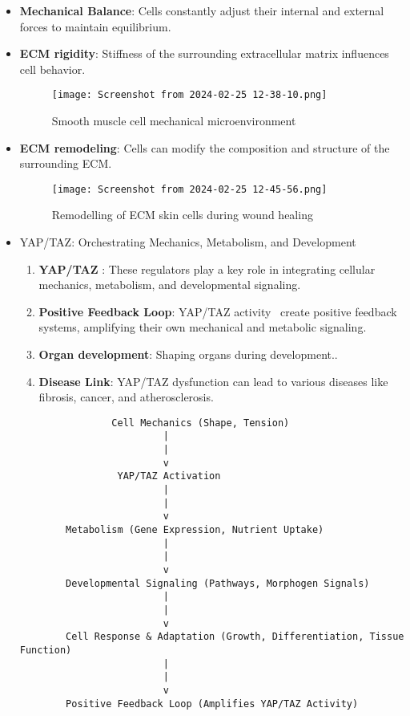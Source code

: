 \documentclass{article}
\begin{document}
\begin{itemize}
\item \textbf{Mechanical Balance}: Cells constantly adjust their internal and external forces to maintain equilibrium.
\item \textbf{ECM rigidity}: Stiffness of the surrounding extracellular matrix influences cell behavior.
\begin{figure}[h]
    \centering
    \texttt{[image: Screenshot from 2024-02-25 12-38-10.png]}
    \caption{Smooth muscle cell mechanical microenvironment}
    \label{fig:enter-label}
\end{figure}
\newpage
\item \textbf{ECM remodeling}: Cells can modify the composition and structure of the surrounding ECM.
\begin{figure}
    \centering
    \texttt{[image: Screenshot from 2024-02-25 12-45-56.png]}
    \caption{Remodelling of ECM skin cells during wound healing}
    \label{fig:enter-label}
\end{figure}
\item YAP/TAZ: Orchestrating Mechanics, Metabolism, and Development
\begin{enumerate}
\item \textbf{YAP/TAZ} : These regulators play a key role in integrating cellular mechanics, metabolism, and developmental signaling.
\item \textbf{Positive Feedback Loop}: YAP/TAZ activity \ create positive feedback systems, amplifying their own mechanical and metabolic signaling.
\item \textbf{Organ development}: Shaping organs during development..
\item \textbf{Disease Link}: YAP/TAZ dysfunction can lead to various diseases like fibrosis, cancer, and atherosclerosis.
\end{enumerate}    
\begin{verbatim}
                Cell Mechanics (Shape, Tension)
                         | 
                         |  
                         v    
                 YAP/TAZ Activation
                         | 
                         |  
                         v    
        Metabolism (Gene Expression, Nutrient Uptake)
                         | 
                         |  
                         v    
        Developmental Signaling (Pathways, Morphogen Signals)
                         | 
                         |  
                         v    
        Cell Response & Adaptation (Growth, Differentiation, Tissue Function)
                         | 
                         |
                         v    
        Positive Feedback Loop (Amplifies YAP/TAZ Activity)
\end{verbatim}
\end{itemize}
\newpage
\end{document}
